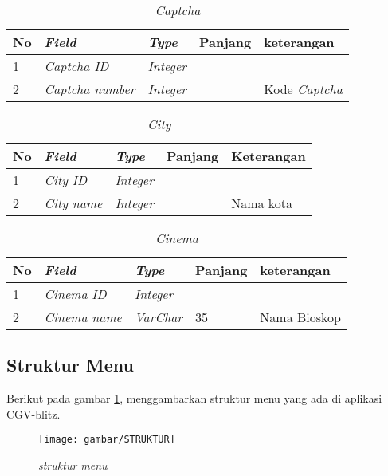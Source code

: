 \begin{table}[!htbp]
\captionsetup{singlelinecheck=off}
\caption{\textit{Captcha}}
\label{kamusdata2}
\begin{tabular}{|l|l|l|l|l|}
\hline
No & \textit{Field} & \textit{Type} & Panjang & keterangan \\
\hline

1 &  \textit{Captcha ID} & \textit{Integer}  &  &   \\

\hline

2 &  \textit{Captcha number} & \textit{Integer}  &  & Kode \textit{Captcha} \\
\hline

\end{tabular}
\end{table}

\begin{table}[!htbp]
\captionsetup{singlelinecheck=off}
\caption{\textit{City}}
\label{kamusdata3}
\begin{tabular}{|l|l|l|l|l|}
\hline
No & \textit{Field} & \textit{Type} & Panjang & Keterangan \\
\hline

1 &  \textit{City ID} & \textit{Integer}  &  &   \\

\hline

2 &  \textit{City name} & \textit{Integer}  &  & Nama kota \\
\hline

\end{tabular}
\end{table}


\begin{table}[!htbp]
\captionsetup{singlelinecheck=off}
\caption{\textit{Cinema}}
\label{kamusdata4}
\begin{tabular}{|l|l|l|l|l|}
\hline
No & \textit{Field} & \textit{Type} & Panjang & keterangan \\
\hline

1 &  \textit{Cinema ID} & \textit{Integer}  &  &   \\

\hline

2 &  \textit{Cinema name} & \textit{VarChar} & 35 & Nama Bioskop \\
\hline

\end{tabular}
\end{table}


\subsection{Struktur Menu}
\par
Berikut pada gambar \ref{struktur}, menggambarkan struktur menu yang ada di aplikasi CGV-blitz.
\begin{figure}[!htbp]
    \centering
    \texttt{[image: gambar/STRUKTUR]}
    \caption{\textit{struktur menu}}
    \label{struktur}
\end{figure}

